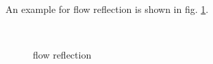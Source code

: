 \documentclass[a4paper,10pt,notitlepage]{scrreprt}
\begin{document}
An example for flow reflection is shown in fig. \ref{fig:flow-reflection}.

\begin{figure}
  \centering
  \\
  \caption{flow reflection}
  \label{fig:flow-reflection}
\end{figure}
\end{document}
